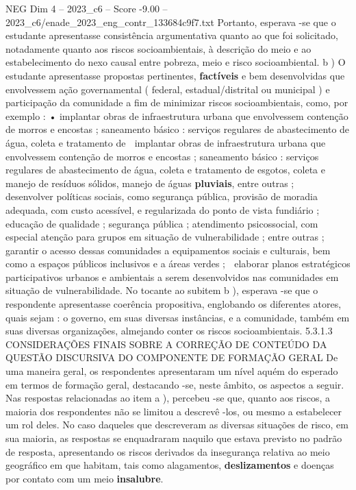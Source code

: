 \begin{textsample}{NEG Dim 4 – 2023\_c6 – Score -9.00 – 2023\_c6/enade\_2023\_eng\_contr\_133684c9f7.txt}
Portanto, esperava -se que o estudante apresentasse consistência argumentativa quanto ao que foi solicitado, notadamente quanto aos riscos socioambientais, à descrição do meio e ao estabelecimento do nexo causal entre pobreza, meio e risco socioambiental. b ) O estudante apresentasse propostas pertinentes, \textbf{factíveis} e bem desenvolvidas que envolvessem ação governamental ( federal, estadual/distrital ou municipal ) e participação da comunidade a fim de minimizar riscos socioambientais, como, por exemplo : • implantar obras de infraestrutura urbana que envolvessem contenção de morros e encostas ; saneamento básico : serviços regulares de abastecimento de água, coleta e tratamento de  implantar obras de infraestrutura urbana que envolvessem contenção de morros e encostas ; saneamento básico : serviços regulares de abastecimento de água, coleta e tratamento de esgotos, coleta e manejo de resíduos sólidos, manejo de águas \textbf{pluviais}, entre outras ;  desenvolver políticas sociais, como segurança pública, provisão de moradia adequada, com custo acessível, e regularizada do ponto de vista fundiário ; educação de qualidade ; segurança pública ; atendimento psicossocial, com especial atenção para grupos em situação de vulnerabilidade ; entre outras ;  garantir o acesso dessas comunidades a equipamentos sociais e culturais, bem como a espaços públicos inclusivos e a áreas verdes ;  elaborar planos estratégicos participativos urbanos e ambientais a serem desenvolvidos nas comunidades em situação de vulnerabilidade.
No tocante ao subitem b ), esperava -se que o respondente apresentasse coerência propositiva, englobando os diferentes atores, quais sejam : o governo, em suas diversas instâncias, e a comunidade, também em suas diversas organizações, almejando conter os riscos socioambientais. 5.3.1.3 CONSIDERAÇÕES FINAIS SOBRE A CORREÇÃO DE CONTEÚDO DA QUESTÃO DISCURSIVA DO COMPONENTE DE FORMAÇÃO GERAL De uma maneira geral, os respondentes apresentaram um nível aquém do esperado em termos de formação geral, destacando -se, neste âmbito, os aspectos a seguir.
Nas respostas relacionadas ao item a ), percebeu -se que, quanto aos riscos, a maioria dos respondentes não se limitou a descrevê -los, ou mesmo a estabelecer um rol deles.
No caso daqueles que descreveram as diversas situações de risco, em sua maioria, as respostas se enquadraram naquilo que estava previsto no padrão de resposta, apresentando os riscos derivados da insegurança relativa ao meio geográfico em que habitam, tais como alagamentos, \textbf{deslizamentos} e doenças por contato com um meio \textbf{insalubre}.

\end{textsample}
